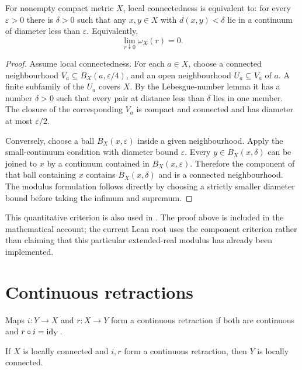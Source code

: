 \begin{theorem}
\label{thm:metric-lc}
For nonempty compact metric $X$, local connectedness is equivalent to:
for every $\varepsilon>0$ there is $\delta>0$ such that any
$x,y\in X$ with $d(x,y)<\delta$ lie in a continuum of diameter less
than $\varepsilon$.  Equivalently,
\[
 \lim_{r\downarrow0}\omega_X(r)=0.
\]
\end{theorem}

\begin{proof}
Assume local connectedness.  For each $a\in X$, choose a connected
neighbourhood $V_a\subseteq B_X(a,\varepsilon/4)$, and an open
neighbourhood $U_a\subseteq V_a$ of $a$.  A finite subfamily of the
$U_a$ covers $X$.  By the Lebesgue-number lemma it has a number
$\delta>0$ such that every pair at distance less than $\delta$ lies
in one member.  The closure of the corresponding $V_a$ is compact
and connected and has diameter at most $\varepsilon/2$.

Conversely, choose a ball $B_X(x,\varepsilon)$ inside a given
neighbourhood.  Apply the small-continuum condition with diameter
bound $\varepsilon$.  Every $y\in B_X(x,\delta)$ can be joined to
$x$ by a continuum contained in $B_X(x,\varepsilon)$.  Therefore
the component of that ball containing $x$ contains
$B_X(x,\delta)$ and is a connected neighbourhood.
The modulus formulation follows directly by choosing a strictly
smaller diameter bound before taking the infimum and supremum.
\end{proof}

This quantitative criterion is also used in
.  The proof above is included in
the mathematical account; the current Lean root uses the component
criterion rather than claiming that this particular extended-real
modulus has already been implemented.

\section{Continuous retractions}

\begin{definition}[Retraction]
Maps $i:Y\to X$ and $r:X\to Y$ form a continuous retraction if both
are continuous and $r\circ i=\operatorname{id}_Y$.
\end{definition}

\begin{theorem}
\label{thm:retraction-lc}
If $X$ is locally connected and $i,r$ form a continuous retraction,
then $Y$ is locally connected.
\end{theorem}

